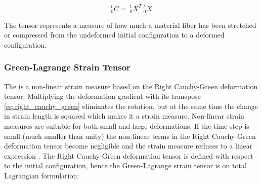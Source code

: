 \begin{equation}
\label{eq:right_cauchy_green}
^t_0C = \ ^t_0X^T \ ^t_0X
\end{equation}

The tensor represents a measure of how much a material fiber has been
stretched or compressed from the undeformed initial configuration to
a deformed configuration. 


\subsubsection*{Green-Lagrange Strain Tensor}
\label{sec:green_lagrange_strain_tensor}

The  is a non-linear strain
measure based on the Right Cauchy-Green deformation tensor.
Multiplying the deformation gradient with its transpose
\eqref{eq:right_cauchy_green} eliminates the rotation, but at the 
same time the change in strain length is squared which makes it a
 strain measure. Non-linear strain measures are suitable
for both small and large deformations. If the time step is small (much
smaller than unity) the non-linear terms in the Right Cauchy-Green
deformation tensor become negligible and the strain measure reduces
to a linear expression .
The Right Cauchy-Green deformation tensor is defined with respect to the
initial configuration, hence the Green-Lagrange strain tensor is on
total Lagrangian formulation:   

